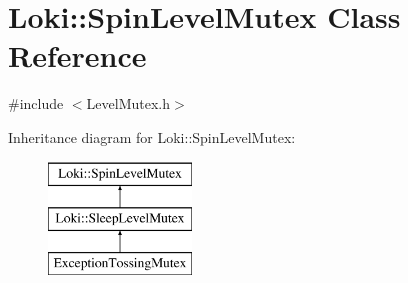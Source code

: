 \hypertarget{classLoki_1_1SpinLevelMutex}{}\section{Loki\+:\+:Spin\+Level\+Mutex Class Reference}
\label{classLoki_1_1SpinLevelMutex}


{\ttfamily \#include $<$Level\+Mutex.\+h$>$}

Inheritance diagram for Loki\+:\+:Spin\+Level\+Mutex\+:\begin{figure}[H]
\begin{center}
\leavevmode
\includegraphics[height=3.000000cm]{classLoki_1_1SpinLevelMutex}
\end{center}
\end{figure}
